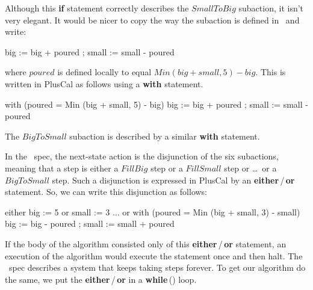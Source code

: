 Although this \textbf{if} statement correctly describes the
$SmallToBig$ subaction, it isn't very elegant.  It would be nicer to
copy the way the subaction is defined in \tlaplus\ and write:
\begin{display}
\begin{nopcal}
big   := big + poured ;                 
small := small - poured
\end{nopcal}
\begin{tlatex}
%
%
\end{tlatex}
\end{display}
where $poured$ is defined locally to equal $Min (big + small, 5) - big$.
This is written in PlusCal as follows using a 
\textbf{with} statement.
\begin{display}
\begin{nopcal}
with (poured = Min (big + small, 5) - big)  
  { big   := big + poured ;                 
    small := small - poured  }
\end{nopcal}
\begin{tlatex}
%
\end{tlatex}
\end{display}
The $BigToSmall$ subaction is described by a similar \textbf{with}
statement.

In the \tlaplus\ spec, the next-state action is the disjunction of the
six subactions, meaning that a step is either a $FillBig$ step or a
$FillSmall$ step or \ldots\ or a $BigToSmall$ step.  Such a disjunction is
expressed in PlusCal by an \textbf{either}\,/\,\textbf{or} statement.
So, we can write this disjunction as follows:
\begin{display}
\begin{nopcal}
either big := 5    
or     small := 3  
...
or     with (poured = Min (big + small, 3) - small)  
         { big   := big - poured ;                 
           small := small + poured }
\end{nopcal}
\begin{tlatex}
%
%
\@x{ \.{\dots}}%
%
\end{tlatex}
\end{display}
If the body of the algorithm consisted only of this
\textbf{either}\,/\,\textbf{or} statement, an execution of the
algorithm would execute the statement once and then halt.  The
\tlaplus\ spec describes a system that keeps taking steps forever.  To
get our algorithm do the same, we put the
\textbf{either}\,/\,\textbf{or} in a \textbf{while}\,(\TRUE) loop.

